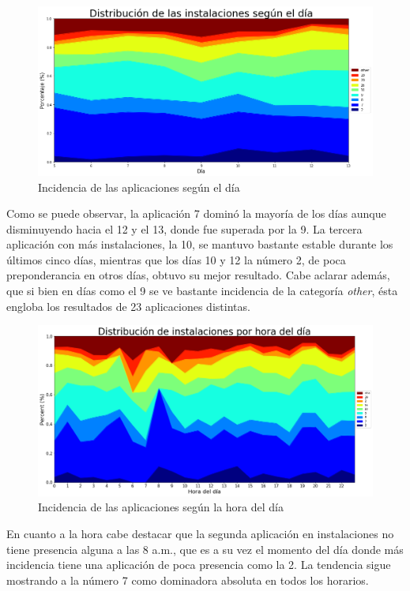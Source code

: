 \documentclass[a4paper, 12pt]{article}
\begin{document}
		\FloatBarrier
		\begin{figure}[h]
			\centering
			\includegraphics[width= \textwidth]{images/installs/appsxdiaarea.png}
			\caption{Incidencia de las aplicaciones según el día}
		\end{figure}
		\FloatBarrier
		
		Como se puede observar, la aplicación 7 dominó la mayoría de los días aunque disminuyendo hacia el 12 y el 13, donde fue superada por la 9. La tercera aplicación con más instalaciones, la 10, se mantuvo bastante estable durante los últimos cinco días, mientras que los días 10 y 12 la número 2, de poca preponderancia en otros días, obtuvo su mejor resultado. Cabe aclarar además, que si bien en días como el 9 se ve bastante incidencia de la categoría \textit{other}, ésta engloba los resultados de 23 aplicaciones distintas.
		
		\FloatBarrier
		\begin{figure}[h]
			\centering
			\includegraphics[width=\textwidth]{images/installs/appsxhora.png}
			\caption{Incidencia de las aplicaciones según la hora del día}
		\end{figure}
		\FloatBarrier
		
		En cuanto a la hora cabe destacar que la segunda aplicación en instalaciones no tiene presencia alguna a las 8 a.m., que es a su vez el momento del día donde más incidencia tiene una aplicación de poca presencia como la 2. La tendencia sigue mostrando a la número 7 como dominadora absoluta en todos los horarios.
		
\end{document}
